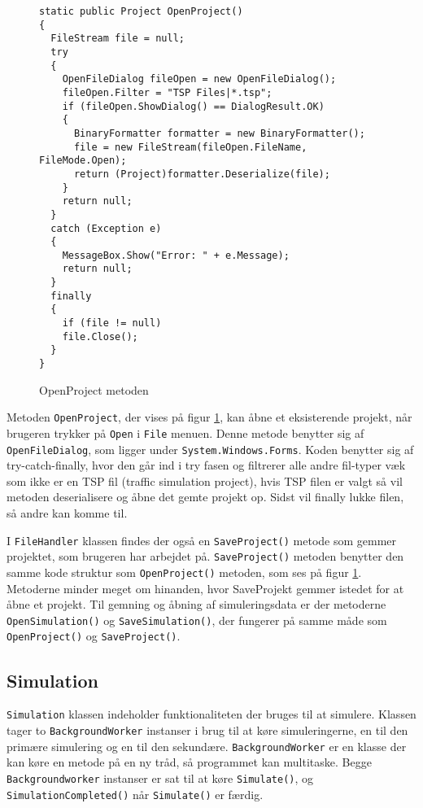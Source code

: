 \begin{figure}[H]
\begin{lstlisting}
static public Project OpenProject()
{
  FileStream file = null;
  try
  {
    OpenFileDialog fileOpen = new OpenFileDialog();
    fileOpen.Filter = "TSP Files|*.tsp";
    if (fileOpen.ShowDialog() == DialogResult.OK)
    {
      BinaryFormatter formatter = new BinaryFormatter();
      file = new FileStream(fileOpen.FileName, FileMode.Open);
      return (Project)formatter.Deserialize(file);
    }
    return null;
  }
  catch (Exception e)
  {
    MessageBox.Show("Error: " + e.Message);
    return null;
  }
  finally
  {
    if (file != null)
    file.Close();
  }
}
\end{lstlisting}
\caption{OpenProject metoden}\label{OpenProjectCode}
\end{figure}

Metoden \texttt{OpenProject}, der vises på figur \ref{OpenProjectCode}, kan åbne et eksisterende projekt, når brugeren trykker på \texttt{Open} i \texttt{File} menuen. Denne metode benytter sig af \texttt{OpenFileDialog}, som ligger under \texttt{System.Windows.Forms}. Koden benytter sig af try-catch-finally, hvor den går ind i try fasen og filtrerer alle andre fil-typer væk som ikke er en TSP fil (traffic simulation project), hvis TSP filen er valgt så vil metoden deserialisere og åbne det gemte projekt op. Sidst vil finally lukke filen, så andre kan komme til.

\vspace{5mm}

I \texttt{FileHandler} klassen findes der også en \texttt{SaveProject()} metode som gemmer projektet, som brugeren har arbejdet på. \texttt{SaveProject()} metoden benytter den samme kode struktur som \texttt{OpenProject()} metoden, som ses på figur \ref{OpenProjectCode}. Metoderne minder meget om hinanden, hvor SaveProjekt gemmer istedet for at åbne et projekt. Til gemning og åbning af simuleringsdata er der metoderne \texttt{OpenSimulation()} og \texttt{SaveSimulation()}, der fungerer på samme måde som \texttt{OpenProject()} og \texttt{SaveProject()}.

\subsection*{Simulation}\label{SimulationClass}
\texttt{Simulation} klassen indeholder funktionaliteten der bruges til at simulere. Klassen tager to \texttt{BackgroundWorker} instanser i brug til at køre simuleringerne, en til den primære simulering og en til den sekundære. \texttt{BackgroundWorker} er en klasse der kan køre en metode på en ny tråd, så programmet kan multitaske. Begge \texttt{Backgroundworker} instanser er sat til at køre \texttt{Simulate()}, og \texttt{SimulationCompleted()} når \texttt{Simulate()} er færdig. 

